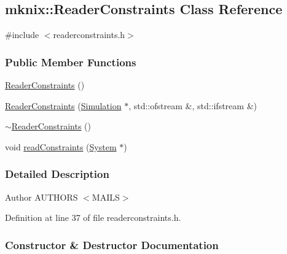 \hypertarget{classmknix_1_1_reader_constraints}{}\subsection{mknix\+:\+:Reader\+Constraints Class Reference}
\label{classmknix_1_1_reader_constraints}


{\ttfamily \#include $<$readerconstraints.\+h$>$}

\subsubsection*{Public Member Functions}
\begin{DoxyCompactItemize}
\item 
\hyperlink{classmknix_1_1_reader_constraints_a6e13e87da554b6a10dfadce3a90ad1fe}{Reader\+Constraints} ()
\item 
\hyperlink{classmknix_1_1_reader_constraints_a89f7f8f61866a81b47063b16c3c953a5}{Reader\+Constraints} (\hyperlink{classmknix_1_1_simulation}{Simulation} $\ast$, std\+::ofstream \&, std\+::ifstream \&)
\item 
\hyperlink{classmknix_1_1_reader_constraints_ae2c0d3f6e3c0d8fdfd99d4902fa8cd0f}{$\sim$\+Reader\+Constraints} ()
\item 
void \hyperlink{classmknix_1_1_reader_constraints_a6661437710a3faf4792236e7b2bf760f}{read\+Constraints} (\hyperlink{classmknix_1_1_system}{System} $\ast$)
\end{DoxyCompactItemize}


\subsubsection{Detailed Description}
\begin{DoxyAuthor}{Author}
A\+U\+T\+H\+O\+R\+S $<$\+M\+A\+I\+L\+S$>$ 
\end{DoxyAuthor}


Definition at line 37 of file readerconstraints.\+h.



\subsubsection{Constructor \& Destructor Documentation}
\hypertarget{classmknix_1_1_reader_constraints_a6e13e87da554b6a10dfadce3a90ad1fe}{}
